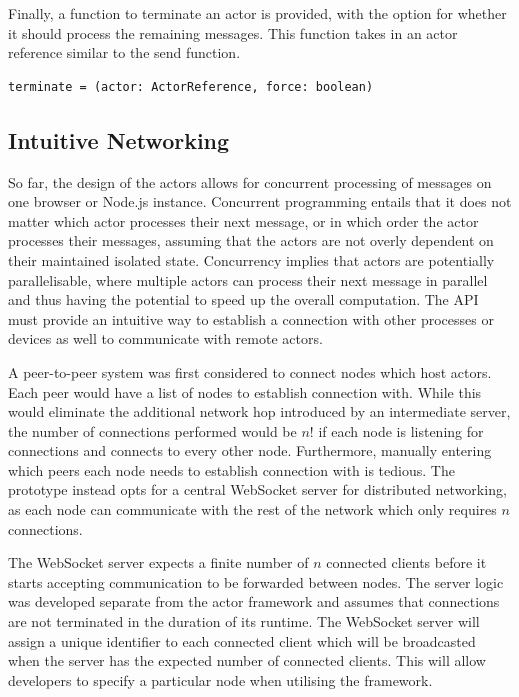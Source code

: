 \documentclass[oneside]{um-fict}
\begin{document}
Finally, a function to terminate an actor is provided, with the option for whether it should process the remaining messages. This function takes in an actor reference similar to the send function.
\begin{lstlisting}
terminate = (actor: ActorReference, force: boolean)
\end{lstlisting}
\subsection{Intuitive Networking}
So far, the design of the actors allows for concurrent processing of messages on one browser or Node.js instance. Concurrent programming entails that it does not matter which actor processes their next message, or in which order the actor processes their messages, assuming that the actors are not overly dependent on their maintained isolated state. Concurrency implies that actors are potentially parallelisable, where multiple actors can process their next message in parallel and thus having the potential to speed up the overall computation. The API must provide an intuitive way to establish a connection with other processes or devices as well to communicate with remote actors.

A peer-to-peer system was first considered to connect nodes which host actors. Each peer would have a list of nodes to establish connection with. While this would eliminate the additional network hop introduced by an intermediate server, the number of connections performed would be $n!$ if each node is listening for connections and connects to every other node. Furthermore, manually entering which peers each node needs to establish connection with is tedious. The prototype instead opts for a central WebSocket server for distributed networking, as each node can communicate with the rest of the network which only requires $n$ connections.

The WebSocket server expects a finite number of $n$ connected clients before it starts accepting communication to be forwarded between nodes. The server logic was developed separate from the actor framework and assumes that connections are not terminated in the duration of its runtime. The WebSocket server will assign a unique identifier to each connected client which will be broadcasted when the server has the expected number of connected clients. This will allow developers to specify a particular node when utilising the framework.
\end{document}
